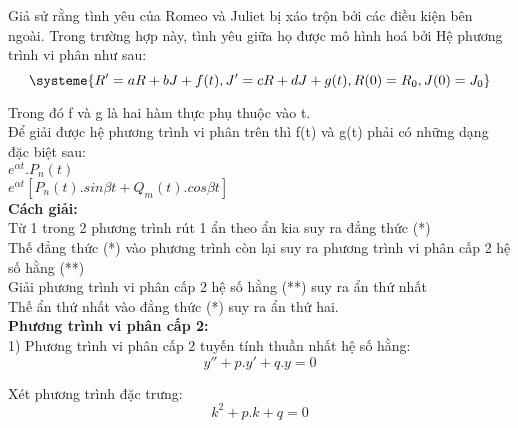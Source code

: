 \newcommand{\hop}[1]{
    \begin{tcolorbox}
    [colback=cyan!15,colframe=orange!75!white]{#1}
    \end{tcolorbox}
}


    Giả sử rằng tình yêu của Romeo và Juliet bị xáo trộn bởi các điều kiện bên ngoài. Trong trường hợp này, tình yêu giữa họ được mô hình hoá bởi Hệ phương trình vi phân như sau:
    \begin{equation}
        \systeme{
            R' = aR + bJ + f(t),
            J' = cR + dJ + g(t),
            R(0) = R_0,
            J(0) = J_0
        }\label{eq:equation2}
    \end{equation}

    Trong đó f và g là hai hàm thực phụ thuộc vào t. \\

    Để giải được hệ phương trình vi phân trên thì f(t) và g(t) phải có những dạng đặc biệt sau: \\

    $e^{\alpha t}.P_n(t)$ \\

    $e^{\alpha t}[P_n(t).sin\beta t +Q_m(t).cos\beta t]$ \\

    \textbf{Cách giải:}\\

    Từ 1 trong 2 phương trình rút 1 ẩn theo ẩn kia suy ra đẳng thức (*) \\

    Thế đẳng thức (*) vào phương trình còn lại suy ra phương trình vi phân cấp 2 hệ số hằng (**) \\

    Giải phương trình vi phân cấp 2 hệ số hằng (**) suy ra ẩn thứ nhất \\

    Thế ẩn thứ nhất vào đẳng thức (*) suy ra ẩn thứ hai.\\

    \textbf{Phương trình vi phân cấp 2:}\\
    1) Phương trình vi phân cấp 2 tuyến tính thuần nhất hệ số hằng:\\

    \begin{equation*}
        y'' + p.y' + q.y = 0
    \end{equation*}

    Xét phương trình đặc trưng:
    \begin{equation*}
        k^2 + p.k + q = 0
    \end{equation*}


